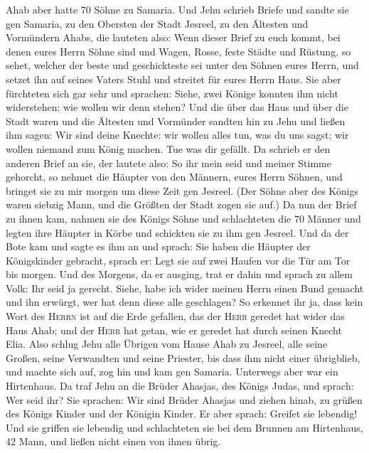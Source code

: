 Ahab aber hatte 70 Söhne zu Samaria. Und Jehu schrieb
Briefe und sandte sie gen Samaria, zu den Obersten der Stadt Jesreel, zu
den Ältesten und Vormündern Ahabs, die lauteten also: 
Wenn dieser Brief zu euch kommt, bei denen eures Herrn Söhne sind und
Wagen, Rosse, feste Städte und Rüstung,  so sehet, welcher
der beste und geschickteste sei unter den Söhnen eures Herrn, und setzet
ihn auf seines Vaters Stuhl und streitet für eures Herrn Haus.
 Sie aber fürchteten sich gar sehr und sprachen: Siehe,
zwei Könige konnten ihm nicht widerstehen; wie wollen wir denn stehen?
 Und die über das Haus und über die Stadt waren und die
Ältesten und Vormünder sandten hin zu Jehu und ließen ihm sagen: Wir
sind deine Knechte: wir wollen alles tun, was du uns sagst; wir wollen
niemand zum König machen. Tue was dir gefällt.  Da schrieb
er den anderen Brief an sie, der lautete also: So ihr mein seid und
meiner Stimme gehorcht, so nehmet die Häupter von den Männern, eures
Herrn Söhnen, und bringet sie zu mir morgen um diese Zeit gen Jesreel.
(Der Söhne aber des Königs waren siebzig Mann, und die Größten der Stadt
zogen sie auf.)  Da nun der Brief zu ihnen kam, nahmen sie
des Königs Söhne und schlachteten die 70 Männer und legten ihre Häupter
in Körbe und schickten sie zu ihm gen Jesreel.  Und da der
Bote kam und sagte es ihm an und sprach: Sie haben die Häupter der
Königskinder gebracht, sprach er: Legt sie auf zwei Haufen vor die Tür
am Tor bis morgen.  Und des Morgens, da er ausging, trat
er dahin und sprach zu allem Volk: Ihr seid ja gerecht. Siehe, habe ich
wider meinen Herrn einen Bund gemacht und ihn erwürgt, wer hat denn
diese alle geschlagen?  So erkennet ihr ja, dass kein
Wort des \textsc{Herrn} ist auf die Erde gefallen, das der \textsc{Herr}
geredet hat wider das Haus Ahab; und der \textsc{Herr} hat getan, wie er
geredet hat durch seinen Knecht Elia.  Also schlug Jehu
alle Übrigen vom Hause Ahab zu Jesreel, alle seine Großen, seine
Verwandten und seine Priester, bis dass ihm nicht einer übrigblieb,
 und machte sich auf, zog hin und kam gen Samaria.
Unterwegs aber war ein Hirtenhaus.  Da traf Jehu an die
Brüder Ahasjas, des Königs Judas, und sprach: Wer seid ihr? Sie
sprachen: Wir sind Brüder Ahasjas und ziehen hinab, zu grüßen des Königs
Kinder und der Königin Kinder.  Er aber sprach: Greifet
sie lebendig! Und sie griffen sie lebendig und schlachteten sie bei dem
Brunnen am Hirtenhaus, 42 Mann, und ließen nicht einen von ihnen übrig.
